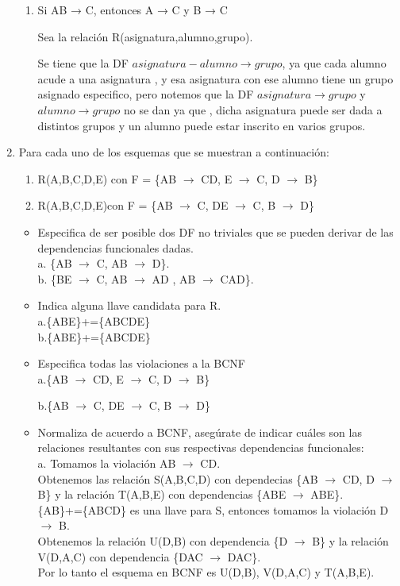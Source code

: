 \documentclass[a4paper, 12pt]{report}
\begin{document}
\begin{enumerate}
{\begin{enumerate}
	\item Si AB → C, entonces A → C y B → C
	
	Sea la relación R(asignatura,alumno,grupo).
	
	Se tiene que la DF $asignatura-alumno \rightarrow grupo$, ya que cada alumno acude a una asignatura , y esa asignatura con ese alumno tiene un grupo asignado especifico, pero notemos que la DF $asignatura \rightarrow grupo$ y $alumno \rightarrow grupo$ no se dan ya que , dicha asignatura puede ser dada a distintos grupos y un alumno puede estar inscrito en varios grupos.  
\end{enumerate}}
\item Para cada uno de los esquemas que se muestran a continuación:
\begin{enumerate}
	\item R(A,B,C,D,E) con F = \{AB $\rightarrow$ CD, E $\rightarrow$ C, D
		$\rightarrow$ B\}
	\item R(A,B,C,D,E)con F = \{AB $\rightarrow$ C, DE $\rightarrow$ C, B $\rightarrow$ D\}
\end{enumerate}
\begin{itemize}
	\item Especifica de  ser  posible dos DF  no  triviales que  se  pueden
	derivar  de  las  dependencias funcionales dadas.\\
	a. \{AB $\rightarrow$ C, AB $\rightarrow$ D\}.\\
	b. \{BE $\rightarrow$ C, AB $\rightarrow$ AD , AB $\rightarrow$ CAD\}.
	
	\item Indica alguna llave candidata para R.\\
	a.\{ABE\}+=\{ABCDE\}\\
	b.\{ABE\}+=\{ABCDE\}
	
	\item Especifica todas las violaciones a la BCNF\\
	a.\{AB $\rightarrow$ CD, E $\rightarrow$ C, D
	$\rightarrow$ B\}
	
	b.\{AB $\rightarrow$ C, DE $\rightarrow$ C, B $\rightarrow$ D\} 
	\item Normaliza de acuerdo a BCNF, asegúrate de indicar cuáles son las
	relaciones resultantes con sus respectivas dependencias funcionales:\\
	a. Tomamos la violación AB $\rightarrow$ CD.\\
	Obtenemos las relación S(A,B,C,D) con dependecias \{AB $\rightarrow$ CD,
	D $\rightarrow$ B\} y la relación T(A,B,E) con dependencias \{ABE $\rightarrow$ ABE\}.\\
	\{AB\}+=\{ABCD\} es una llave para S, entonces tomamos la violación D $\rightarrow$ B.\\
	Obtenemos la relación U(D,B) con dependencia \{D $\rightarrow$ B\} y la
	relación V(D,A,C) con dependencia \{DAC $\rightarrow$ DAC\}.\\
	Por lo tanto el esquema en BCNF es U(D,B), V(D,A,C) y T(A,B,E).
	

\end{itemize}
\end{enumerate}
\end{document}
